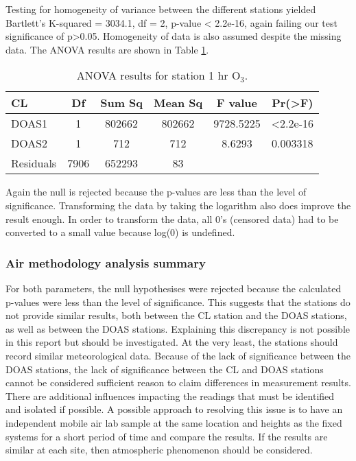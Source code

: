 Testing for  homogeneity of variance between the different stations yielded Bartlett's K-squared = 3034.1, df = 2, p-value < 2.2e-16, again failing our test significance of p>0.05. Homogeneity of data is also assumed despite the missing data. The ANOVA results are shown in Table \ref{tab:anovao3}.

\begin{table}[H]
\centering
\caption{ANOVA results for station 1 hr O$_{3}$. }
\label{tab:anovao3}
\begin{tabular}{@{}lccccc@{}}
\toprule
\textbf{CL} & \textbf{Df} & \textbf{Sum Sq} & \textbf{Mean Sq} & \textbf{F value} & \textbf{Pr(>F)} \\ \midrule
DOAS1 & 1 & 802662 & 802662 & 9728.5225 & \textless 2.2e-16 \\
DOAS2 & 1 & 712 & 712 & 8.6293 & 0.003318 \\
Residuals & 7906 & 652293 & 83 &  &  \\ \bottomrule
\end{tabular}
\end{table}

Again the null is rejected because the p-values are less than the level of significance. Transforming the data by taking the logarithm also does improve the result enough. In order to transform the data, all 0's (censored data) had to be converted to a small value because log(0) is undefined. 

\subsubsection{Air methodology analysis summary}

For both parameters, the null hypothesises were rejected because the calculated p-values were less than the level of significance. This suggests that the stations do not provide similar results, both between the CL station and the DOAS stations, as well as between the DOAS stations. Explaining this discrepancy is not possible in this report but should be investigated. At the very least, the stations should record similar meteorological data. Because of the lack of significance between the DOAS stations, the lack of significance between the CL and DOAS stations cannot be considered sufficient reason to claim differences in measurement results. There are additional influences impacting the readings that must be identified and isolated if possible. A possible approach to resolving this issue is to have an independent mobile air lab sample at the same location and heights as the fixed systems for a short period of time and compare the results. If the results are similar at each site, then atmospheric phenomenon should be considered.

